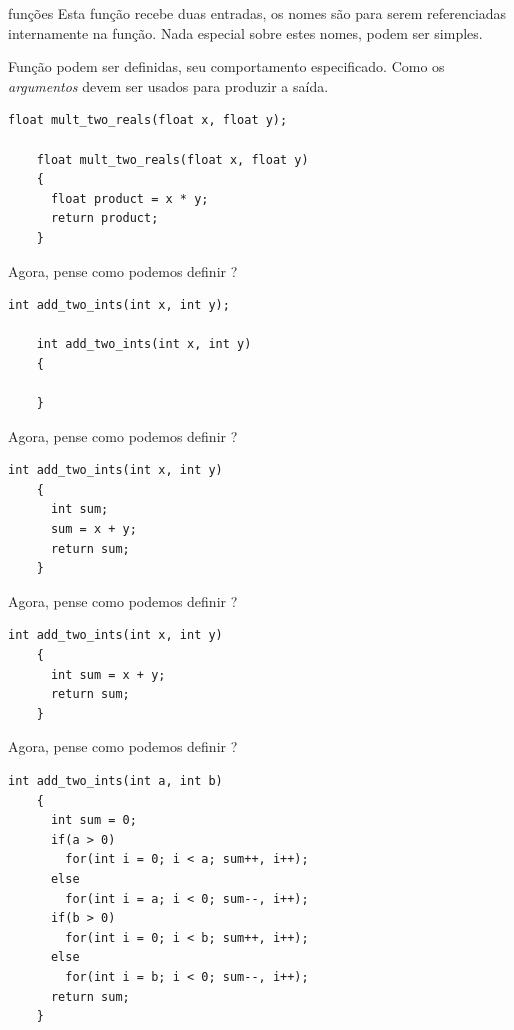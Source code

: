 \documentclass{beamer}
\begin{document}
\begin{frame}{funções}
  Esta função recebe duas entradas, os nomes são para serem
  referenciadas internamente na função. Nada especial sobre estes
  nomes, podem ser simples.

  \framebreak

  Função podem ser definidas, seu comportamento especificado. Como os
  \emph{argumentos} devem ser usados para produzir a
  saída.\vspace{.5cm}

  \begin{lstlisting}[style=normalc]
    float mult_two_reals(float x, float y);
    
    float mult_two_reals(float x, float y)
    {
      float product = x * y;
      return product;
    }
  \end{lstlisting}

  \framebreak

  Agora, pense como podemos definir ?\vspace{.5cm}

  \begin{lstlisting}[style=normalc]
    int add_two_ints(int x, int y);
    
    int add_two_ints(int x, int y)
    {
      
    }
  \end{lstlisting}

  \framebreak

  Agora, pense como podemos definir ?\vspace{.5cm}

  \begin{lstlisting}[style=normalc]
    int add_two_ints(int x, int y)
    {
      int sum;
      sum = x + y;
      return sum;
    }
  \end{lstlisting}

  \framebreak

  Agora, pense como podemos definir ?\vspace{.5cm}

  \begin{lstlisting}[style=normalc]
    int add_two_ints(int x, int y)
    {
      int sum = x + y;
      return sum;
    }
  \end{lstlisting}

  \framebreak

  Agora, pense como podemos definir ?\vspace{.5cm}

  \begin{lstlisting}[style=normalc]
    int add_two_ints(int a, int b)
    {
      int sum = 0;
      if(a > 0)
        for(int i = 0; i < a; sum++, i++);
      else
        for(int i = a; i < 0; sum--, i++);
      if(b > 0)
        for(int i = 0; i < b; sum++, i++);
      else
        for(int i = b; i < 0; sum--, i++);
      return sum;
    }
  \end{lstlisting}


\end{frame}
\end{document}
